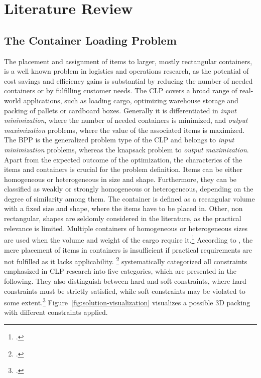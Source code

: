 \chapter{Literature Review}

\section{The Container Loading Problem}
\label{sec:clp_definition}

The placement and assignment of items to larger, mostly rectangular
containers, is a well known problem in logistics and operations research, as the
potential of cost savings and efficiency gains is substantial by reducing the number
of needed containers or by fulfilling customer needs. The \gls{CLP} covers a broad range of real-world applications,
such as loading cargo, optimizing warehouse storage and packing of pallets or cardboard boxes.
Generally it is differentiated in \textit{input minimization},
where the number of needed containers is minimized, and \textit{output maximization} problems,
where the value of the associated items is maximized. The \gls{BPP} is the generalized problem type of the \gls{CLP}
and belongs to \textit{input minimization} problems, whereas the knapsack problem to \textit{output maximization}. Apart from the expected outcome of the optimization,
the characterics of the items and containers is crucial for the problem definition. Items can be either
homogeneous or heterogeneous in size and shape. Furthermore, they can be classified as weakly or strongly
homogeneous or heterogeneous, depending on the degree of similarity among them. The container is
defined as a recangular volume with a fixed size and shape, where the items have to be placed in.
Other, non rectangular, shapes are seldomly considered in the literature, as the practical relevance is
limited. Multiple containers of homogeneous or heterogeneous sizes are used when the volume and weight
of the cargo require it.\footcite[cf.][pp. 1--2]{bortfeldt_constraints_2013}
According to \textcite{bischoff_issues_1995}, the mere placement of items in containers is insufficient
if practical requirements are not fulfilled as it lacks applicability. \footcite[cf.][pp. 1--2]{bischoff_issues_1995}
\textcite{bortfeldt_constraints_2013} systematically categorized all constraints emphasized in \gls{CLP} research
into five categories, which are presented in the following. They also distinguish between hard and soft constraints,
where hard constraints must be strictly satisfied, while soft constraints may be violated
to some extent.\footcite[cf.][p. 2]{bortfeldt_constraints_2013}  Figure~\ref{fig:solution-visualization}
visualizes a possible 3D packing with different constraints applied.

